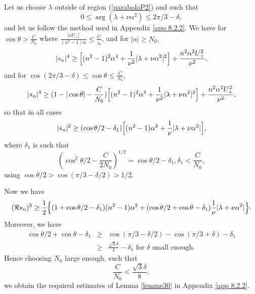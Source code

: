 \documentclass[11pt]{article}
\begin{document}
Let us choose $\lambda $ outside of region (\ref{parabolaP2}) and such that 
\begin{equation*}
0\leq \arg (\lambda +\nu \alpha ^{2})\leq 2\pi /3-\delta ,
\end{equation*}%
and let us follow the method used in Appendix \ref{app 8.2.2}. We have for $%
\cos \theta >\frac{C}{N_{0}}$ where $\frac{|n U_+ |}{(n^{2}-1)\alpha ^{}}%
\leq \frac{C}{_{N_{0}}}$, and for $|n|\geq N_{0},$ 
\begin{equation*}
|s_{n}|^{4}\geq \Bigl[ (n^{2}-1)^{2}\alpha ^{4}+\frac{1}{\nu ^{2}}|\lambda
+\nu \alpha ^{2}|^{2} \Bigr]+\frac{n^{2}\alpha^2 U_+^{2}}{\nu ^{2}},
\end{equation*}%
and for $\cos (2\pi /3-\delta )\leq \cos \theta \leq \frac{C}{N_{0}},$%
\begin{equation*}
|s_{n}|^{4}\geq (1-|\cos \theta |-\frac{C}{N_{0}}) \Bigl[ (n^{2}-1)^{2}\alpha ^{4}+%
\frac{1}{\nu ^{2}}|\lambda +\nu \alpha ^{2}|^{2} \Bigr]+\frac{n^{2}\alpha^2 U_+^{2}}{%
\nu ^{2}},
\end{equation*}%
so that in all cases%
\begin{equation*}
|s_{n}|^{2}\geq (\cos \theta /2-\delta _{1}) \Bigl[(n^{2}-1)\alpha ^{2}+\frac{1}{%
\nu }|\lambda +\nu \alpha ^{2}| \Bigr],
\end{equation*}%
where $\delta _{1}$ is such that%
\begin{equation*}
(\cos ^{2}\theta /2-\frac{C}{2N_{0}})^{1/2}=\cos \theta /2-\delta _{1},\text{
}\delta _{1}<\frac{C}{N_{0}},
\end{equation*}%
using $\cos \theta /2>\cos (\pi /3-\delta /2)>1/2.$

Now we have 
\begin{equation*}
(\Re s_{n})^{2}\geq \frac{1}{2}\Bigl\{(1+\cos \theta /2-\delta
_{1})(n^{2}-1)\alpha ^{2}+(\cos \theta /2+\cos \theta -\delta _{1})\frac{1}{%
\nu }|\lambda +\nu \alpha ^{2}|\Bigr\}.
\end{equation*}%
Moreover, we have
\begin{eqnarray*}
\cos \theta /2+\cos \theta -\delta _{1} &\geq &\cos (\pi /3-\delta /2)-\cos
(\pi /3+\delta )-\delta _{1} \\
&\geq &\frac{\sqrt{3}\delta }{4}-\delta _{1}\text{ for }\delta \text{ small
enough.}
\end{eqnarray*}%
Hence choosing $N_{0}$ large enough, such that 
\begin{equation*}
\frac{C}{N_{0}}<\frac{\sqrt{3}\delta }{8},
\end{equation*}%
we obtain the required estimates of Lemma \ref{lemme30} in Appendix \ref{app 8.2.2}. 
\end{document}
